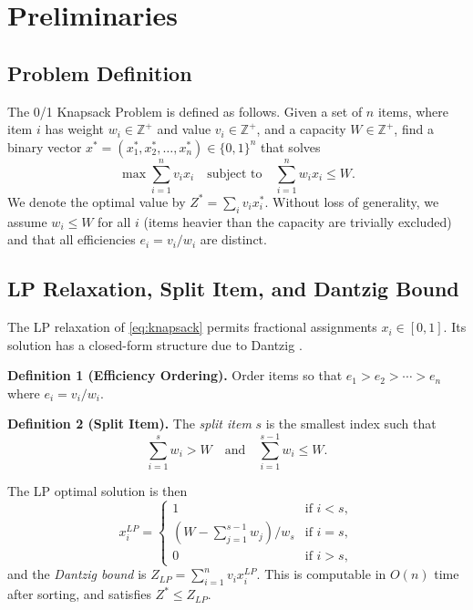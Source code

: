 \documentclass[conference]{IEEEtran} \IEEEoverridecommandlockouts
\begin{document}
\section{Preliminaries}

\subsection{Problem Definition}

The 0/1 Knapsack Problem is defined as follows. Given a set of $n$ items, where item $i$ has weight $w_i \in \mathbb{Z}^+$ and value $v_i \in \mathbb{Z}^+$, and a capacity $W \in \mathbb{Z}^+$, find a binary vector $x^* = (x_1^*, x_2^*, \ldots, x_n^*) \in \{0,1\}^n$ that solves
\begin{equation}
    \max \sum_{i=1}^{n} v_i x_i \quad \text{subject to} \quad \sum_{i=1}^{n} w_i x_i \leq W.
    \label{eq:knapsack}
\end{equation}
We denote the optimal value by $Z^* = \sum_{i} v_i x_i^*$. Without loss of generality, we assume $w_i \leq W$ for all $i$ (items heavier than the capacity are trivially excluded) and that all efficiencies $e_i = v_i / w_i$ are distinct.

\subsection{LP Relaxation, Split Item, and Dantzig Bound}

The LP relaxation of \eqref{eq:knapsack} permits fractional assignments $x_i \in [0,1]$. Its solution has a closed-form structure due to Dantzig \cite{ref1}.

\textbf{Definition 1 (Efficiency Ordering).} Order items so that $e_1 > e_2 > \cdots > e_n$ where $e_i = v_i / w_i$.

\textbf{Definition 2 (Split Item).} The \textit{split item} $s$ is the smallest index such that
\begin{equation}
    \sum_{i=1}^{s} w_i > W \quad \text{and} \quad \sum_{i=1}^{s-1} w_i \leq W.
    \label{eq:split}
\end{equation}

The LP optimal solution is then
\begin{equation}
    x_i^{LP} = \begin{cases}
    1 & \text{if } i < s, \\
    (W - \sum_{j=1}^{s-1} w_j) / w_s & \text{if } i = s, \\
    0 & \text{if } i > s,
    \end{cases}
    \label{eq:lpsol}
\end{equation}
and the \textit{Dantzig bound} is $Z_{LP} = \sum_{i=1}^{n} v_i x_i^{LP}$. This is computable in $O(n)$ time after sorting, and satisfies $Z^* \leq Z_{LP}$.
\end{document}
